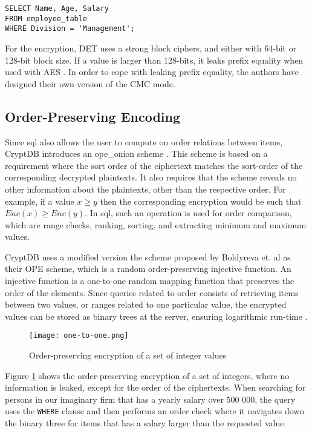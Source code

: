 \begin{verbatim}
SELECT Name, Age, Salary
FROM employee_table
WHERE Division = 'Management';
\end{verbatim}

For the encryption, DET uses a strong block ciphers, and either with 64-bit or 128-bit block size. If a value is larger than 128-bits, it leaks  prefix equality when used with AES \citep{CryptDB_Main_Paper}. In order to cope with leaking prefix equality, the authors have designed their own version of the CMC mode.



\subsection{Order-Preserving Encoding}
\label{sec:ope}

Since \Gls{sql} also allows the user to compute on order relations between items, CryptDB introduces an \Gls{ope_onion} scheme \citep{CryptDB_Main_Paper}. This scheme is based on a requirement where the sort order of the ciphertext matches the sort-order of the corresponding decrypted plaintexts. It also requires that the scheme reveals no other information about the plaintexts, other than the respective order. For example, if a value $x \ge y$ then the corresponding encryption would be such that $Enc(x) \ge Enc(y)$. In \Gls{sql}, such an operation is used for order comparison, which are range checks, ranking, sorting, and extracting minimum and maximum values. 

CryptDB uses a modified version the scheme proposed by Boldyreva et. al \citep{ope_cryptdb} as their OPE scheme, which is a random order-preserving injective function. An injective function is a one-to-one random mapping function that preserves the order of the elements. Since queries related to order consists of retrieving items between two values, or ranges related to one particular value, the encrypted values can be stored as binary trees at the server, ensuring logarithmic run-time \cite{ope_cryptdb}.



\begin{figure}[h]
	\texttt{[image: one-to-one.png]}
	\caption{Order-preserving encryption of a set of integer values}
	\label{fig:ope_function}
\end{figure}

Figure \ref{fig:ope_function} shows the order-preserving encryption of a set of integers, where no information is leaked, except for the order of the ciphertexts. When searching for persons in our imaginary firm that has a yearly salary over 500 000, the query uses the \verb!WHERE! clause and then performs an order check where it navigates down the binary three for items that has a salary larger than the requested value.

